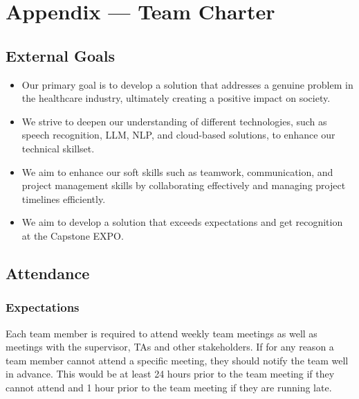 \documentclass{article}
\begin{document}
\newpage{}

\section*{Appendix --- Team Charter}


\subsection*{External Goals}
\begin{itemize}
\item Our primary goal is to develop a solution that addresses a genuine problem in the healthcare industry, ultimately creating a positive impact on society. 
\item We strive to deepen our understanding of different technologies, such as speech recognition, LLM, NLP, and cloud-based solutions, to enhance our technical skillset. 
\item We aim to enhance our soft skills such as teamwork, communication, and project management skills by collaborating effectively and managing project timelines efficiently. 
\item We aim to develop a solution that exceeds expectations and get recognition at the Capstone EXPO. 
\end {itemize}

\subsection*{Attendance}

\subsubsection*{Expectations}
Each team member is required to attend weekly team meetings as well as meetings with the supervisor, TAs and other stakeholders. If for any reason a team member cannot attend a specific meeting, they should notify the team well in advance. This would be at least 24 hours prior to the team meeting if they cannot attend and 1 hour prior to the team meeting if they are running late.
\end{document}
